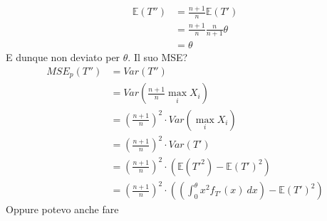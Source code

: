 \documentclass[11pt]{report}
\begin{document}
\begin{equation}
	\begin{split}
		\mathbb{E}(T'') & = \frac{n+1}{n} \mathbb{E}(T')\\
		& = \frac{n+1}{n} \frac{n}{n+1} \theta\\
		& = \theta
	\end{split}
\end{equation}
E dunque non deviato per $\theta$. Il suo MSE?
\begin{equation}
    \begin{split}
        MSE_p(T'') & = Var(T'')\\
        & = Var \left( \frac{n+1}{n} \max_i X_i \right)\\
        & = \left( \frac{n+1}{n} \right)^2\cdot Var \left( \max_i X_i \right)\\
        & = \left( \frac{n+1}{n} \right)^2 \cdot Var(T')\\
        & = \left( \frac{n+1}{n} \right)^2 \cdot \left( \mathbb{E} \left( {T'}^2 \right) - \mathbb{E}(T')^2 \right)\\
        & = \left( \frac{n+1}{n} \right)^2 \cdot \left( \left( \int_0^\theta x^2 f_{T'}(x)\ dx \right) - \mathbb{E}(T')^2 \right)
    \end{split}
\end{equation}
Oppure potevo anche fare
\end{document}
